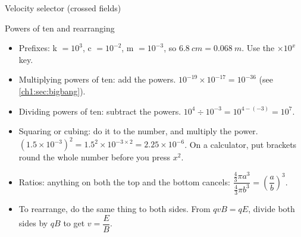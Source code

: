 \begin{formulacard}[notonsheet]{Velocity selector (crossed fields)}
  \begin{symbols}
  \end{symbols}
\end{formulacard}

\begin{toolkit}{Powers of ten and rearranging}
\begin{itemize}
  \item Prefixes: k $=10^{3}$, c $=10^{-2}$, m $=10^{-3}$, so
        $\qty{6.8}{cm} = \qty{0.068}{m}$. Use the $\times10^{x}$ key.
  \item Multiplying powers of ten: add the powers.
        $10^{-19}\times10^{-17} = 10^{-36}$ (see \cref{ch1:sec:bigbang}).
  \item Dividing powers of ten: subtract the powers.
        $10^{4} \div 10^{-3} = 10^{4-(-3)} = 10^{7}$.
  \item Squaring or cubing: do it to the number, and multiply the power.
        $(1.5\times10^{-3})^2 = 1.5^2\times10^{-3\times2} = 2.25\times10^{-6}$.
        On a calculator, put brackets round the whole number before you press $x^2$.
  \item Ratios: anything on both the top and the bottom cancels:
        $\dfrac{\tfrac43\pi a^3}{\tfrac43\pi b^3} = \left(\dfrac{a}{b}\right)^3$.
  \item To rearrange, do the same thing to both sides. From $qvB = qE$, divide
        both sides by $qB$ to get $v = \dfrac{E}{B}$.
\end{itemize}
\end{toolkit}

